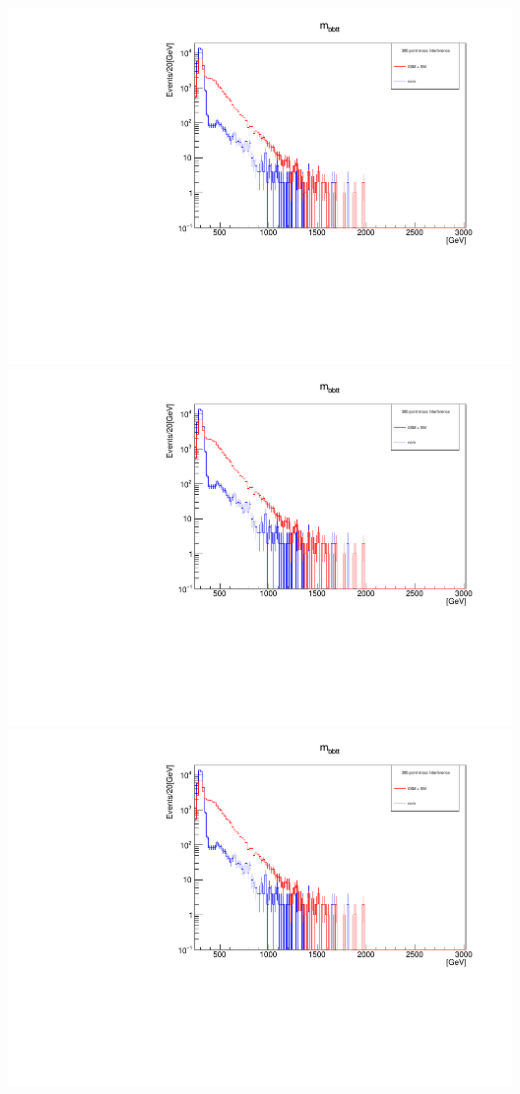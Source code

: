 \documentclass[a4wide,10pt]{article}
\begin{document}
\includegraphics[scale=0.50,page=4]{InterferencePlots05p.pdf}
\includegraphics[scale=0.50,page=5]{InterferencePlots05p.pdf}
\includegraphics[scale=0.50,page=6]{InterferencePlots05p.pdf}
\end{document}
